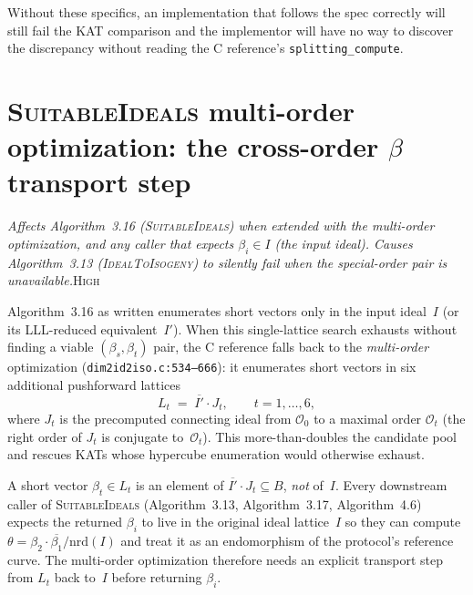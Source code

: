 \documentclass[a4paper,11pt]{article}
\newcommand{\algo}[1]{Algorithm~#1}
\newcommand{\high}{\textsc{\color{BurntOrange}High}}
\newcommand{\finding}[2]{\noindent\textit{#1}\hfill#2\par\smallskip}
\begin{document}
Without these specifics, an implementation that follows the spec
correctly will still fail the KAT comparison and the implementor
will have no way to discover the discrepancy without reading the
C reference's \texttt{splitting\_compute}.

\section{\textsc{SuitableIdeals} multi-order optimization: the
  cross-order $\beta$ transport step}
\label{sec:specrev-suitable-multi-order-transport}

\finding{Affects \algo{3.16} (\textsc{SuitableIdeals}) when extended
  with the multi-order optimization, and any caller that expects
  $\beta_i \in I$ (the input ideal).  Causes \algo{3.13}
  (\textsc{IdealToIsogeny}) to silently fail
  when the special-order pair is unavailable.}{\high}

\algo{3.16} as written enumerates short vectors only in the input
ideal~$I$ (or its LLL-reduced equivalent~$I'$).  When this
single-lattice search exhausts without finding a viable
$(\beta_s, \beta_t)$ pair, the C reference falls back to the
\emph{multi-order} optimization
(\texttt{dim2id2iso.c:534--666}): it enumerates short vectors in
six additional pushforward lattices
\[
  L_t \;=\; \overline{I'} \cdot J_t,
  \qquad t = 1, \ldots, 6,
\]
where $J_t$ is the precomputed connecting ideal from $\mathcal{O}_0$
to a maximal order $\mathcal{O}_t$ (the right order of $J_t$ is
conjugate to~$\mathcal{O}_t$).  This more-than-doubles the
candidate pool and rescues KATs whose hypercube enumeration would
otherwise exhaust.

A short vector $\beta_t \in L_t$ is an element of
$\overline{I'} \cdot J_t \subseteq B$, \emph{not} of~$I$.  Every
downstream caller of \textsc{SuitableIdeals} (\algo{3.13},
\algo{3.17}, \algo{4.6}) expects the returned $\beta_i$ to live
in the original ideal lattice~$I$ so they can compute
$\theta = \beta_2 \cdot \overline{\beta_1} / \mathrm{nrd}(I)$ and
treat it as an endomorphism of the protocol's reference curve.
The multi-order optimization therefore needs an explicit transport
step from $L_t$ back to~$I$ before returning $\beta_i$.
\end{document}
